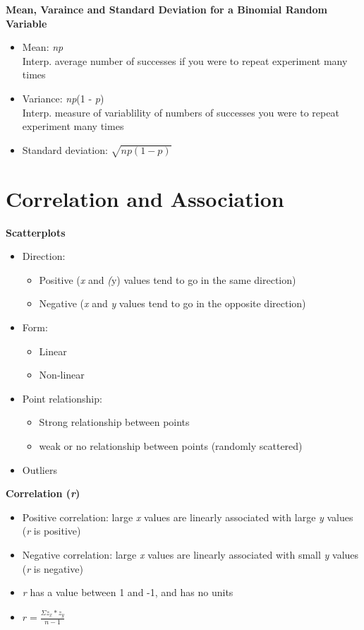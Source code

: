 \documentclass{article}
\begin{document}
\noindent
\textbf{Mean, Varaince and Standard Deviation for a Binomial Random Variable}
\begin{itemize}
    \item Mean: \emph{np} \\
    Interp. average number of successes if you were to repeat experiment many times
    \item Variance: \emph{np}(1 - \emph{p}) \\
    Interp. measure of variablility of numbers of successes you were to repeat experiment many times
    \item Standard deviation: \begin{math}
        \sqrt{np(1-p)}
    \end{math}
    
\end{itemize}


\section{Correlation and Association}

\textbf{Scatterplots}
\begin{itemize}
    \item Direction:
    \begin{itemize}
        \item Positive (\emph{x} and \emph(y) values tend to go in the same direction)
        \item Negative (\emph{x} and \emph{y} values tend to go in the opposite direction)
    \end{itemize}
    \item Form:
    \begin{itemize}
        \item Linear
        \item Non-linear
    \end{itemize}
    \item Point relationship:
    \begin{itemize}
        \item Strong relationship between points
        \item weak or no relationship between points (randomly scattered)
    \end{itemize}
    \item Outliers
\end{itemize}

\noindent
\textbf{Correlation (\emph{r})}
\begin{itemize}
    \item Positive correlation: large \emph{x} values are linearly associated with large \emph{y} values (\emph{r} is positive)
    \item Negative correlation: large \emph{x} values are linearly associated with small \emph{y} values (\emph{r} is negative)
    \item \emph{r} has a value between 1 and -1, and has no units
    \item \begin{math}
    r = \frac{\Sigma z_x * z_y}{n - 1}
    \end{math}
\end{itemize}
\end{document}
